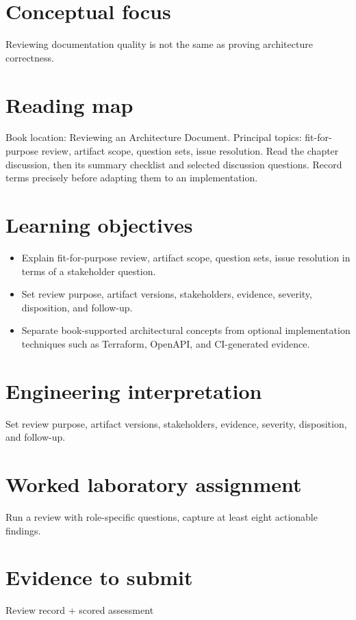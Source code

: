 \documentclass[10pt,letterpaper]{article}
\begin{document}
\DocProvenance
\section{Conceptual focus}
Reviewing documentation quality is not the same as proving architecture correctness.

\section{Reading map}
Book location: Reviewing an Architecture Document. Principal topics: fit-for-purpose review, artifact scope, question sets, issue resolution. Read the chapter discussion, then its summary checklist and selected discussion questions. Record terms precisely before adapting them to an implementation.

\section{Learning objectives}
\begin{itemize}
\item Explain fit-for-purpose review, artifact scope, question sets, issue resolution in terms of a stakeholder question.
\item Set review purpose, artifact versions, stakeholders, evidence, severity, disposition, and follow-up.
\item Separate book-supported architectural concepts from optional implementation techniques such as Terraform, OpenAPI, and CI-generated evidence.
\end{itemize}
\section{Engineering interpretation}
Set review purpose, artifact versions, stakeholders, evidence, severity, disposition, and follow-up.

\section{Worked laboratory assignment}
Run a review with role-specific questions, capture at least eight actionable findings.

\section{Evidence to submit}
Review record + scored assessment
\end{document}
